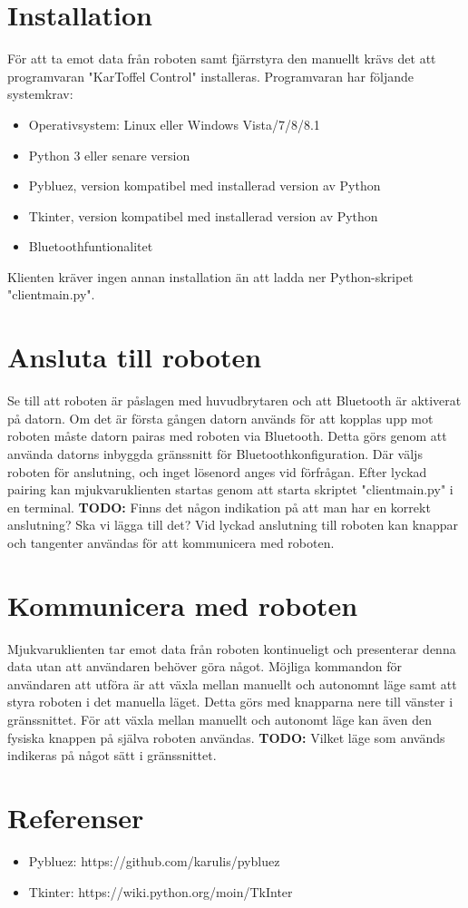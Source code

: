 \documentclass{article}
\begin{document}
\section{Installation}
För att ta emot data från roboten samt fjärrstyra den manuellt krävs det att programvaran "KarToffel Control" installeras. Programvaran har följande systemkrav:
\begin{itemize}
    \item Operativsystem: Linux eller Windows Vista/7/8/8.1
    \item Python 3 eller senare version
    \item Pybluez, version kompatibel med installerad version av Python
    \item Tkinter, version kompatibel med installerad version av Python
    \item Bluetoothfuntionalitet
\end{itemize}

Klienten kräver ingen annan installation än att ladda ner Python-skripet "client\textunderscore main.py".

\section{Ansluta till roboten}
Se till att roboten är påslagen med huvudbrytaren och att Bluetooth är aktiverat på datorn. Om det är första gången datorn används för att kopplas upp mot roboten måste datorn pairas med roboten via Bluetooth. Detta görs genom att använda datorns inbyggda gränssnitt för Bluetoothkonfiguration. Där väljs roboten för anslutning, och inget lösenord anges vid förfrågan. Efter lyckad pairing kan mjukvaruklienten startas genom att starta skriptet "client\textunderscore main.py" i en terminal. 
\textbf{TODO:} Finns det någon indikation på att man har en korrekt anslutning? Ska vi lägga till det?
Vid lyckad anslutning till roboten kan knappar och tangenter användas för att kommunicera med roboten. 

\section{Kommunicera med roboten}
Mjukvaruklienten tar emot data från roboten kontinueligt och presenterar denna data utan att användaren behöver göra något.
Möjliga kommandon för användaren att utföra är att växla mellan manuellt och autonomnt läge samt att styra roboten i det manuella läget. Detta görs med knapparna nere till vänster i gränssnittet.
För att växla mellan manuellt och autonomt läge kan även den fysiska knappen på själva roboten användas. 
\textbf{TODO:} Vilket läge som används indikeras på något sätt i gränssnittet.

\section{Referenser}
\begin{itemize}
	\item Pybluez: https://github.com/karulis/pybluez
	\item Tkinter: https://wiki.python.org/moin/TkInter
\end{itemize}

\nocite{*}
{}

\end{document}
